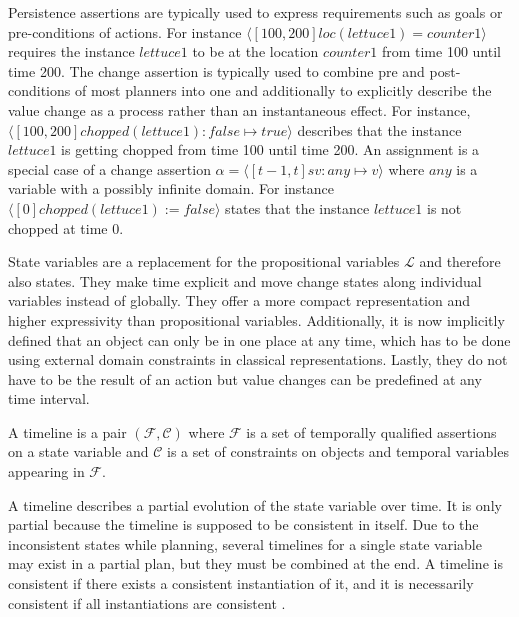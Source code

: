 Persistence assertions are typically used to express requirements such as goals or pre-conditions of actions.
For instance $\langle[100,200] loc(lettuce1) = counter1\rangle$ requires the instance $lettuce1$ to be at the location $counter1$ from time 100 until time 200.
The change assertion is typically used to combine pre and post-conditions of most planners into one and additionally to explicitly describe the value change as a process rather than an instantaneous effect.
For instance, $\langle [100,200] chopped(lettuce1) : \mathit{false} \mapsto \mathit{true} \rangle$ describes that the instance $lettuce1$ is getting chopped from time 100 until time 200.
An assignment is a special case of a change assertion $\alpha = \langle [t-1,t] sv: any \mapsto v \rangle$ where $any$ is a variable with a possibly infinite domain.
For instance $\langle [0] chopped(lettuce1) := \mathit{false} \rangle$ states that the instance $lettuce1$ is not chopped at time 0.

State variables are a replacement for the propositional variables $\mathcal{L}$ and therefore also states.
They make time explicit and move change states along individual variables instead of globally.
They offer a more compact representation and higher expressivity than propositional variables.
Additionally, it is now implicitly defined that an object can only be in one place at any time, which has to be done using external domain constraints in classical representations. 
Lastly, they do not have to be the result of an action but value changes can be predefined at any time interval.

\begin{definition}[Timeline]
  A timeline is a pair $(\mathcal{F},\mathcal{C})$ where $\mathcal{F}$ is a set of temporally qualified assertions on a state variable and $\mathcal{C}$ is a set of constraints on objects and temporal variables appearing in $\mathcal{F}$.
\end{definition}
A timeline describes a partial evolution of the state variable over time.
It is only partial because the timeline is supposed to be consistent in itself.
Due to the inconsistent states while planning, several timelines for a single state variable may exist in a partial plan, but they must be combined at the end.
A timeline is consistent if there exists a consistent instantiation of it, and it is necessarily consistent if all instantiations are consistent \cite{bit-monnotTemporalHierarchicalModels2016a}.


